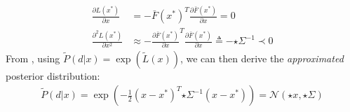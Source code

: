 %
\begin{align}
\tfrac{\partial L(x^*)}{\partial x} &= - \bar{F}(x^*)^T 
\tfrac{\partial \bar{F}(x^*)}{\partial x} = 0 
\label{eq:taylor-jacobian}
\\
\tfrac{\partial^2 L(x^*)}{\partial x^2} 
& \approx - \tfrac{\partial \bar{F}(x^*)}{\partial x}^T \tfrac{\partial \bar{F}(x^*)}{\partial x}
\triangleq %
-{\star{\Sigma}}^{-1} \prec 0
\label{eq:taylor-hessian}
\end{align}
% 
From , using $\tilde P(d|x) = \exp (\tilde{L}(x))$, we can then derive the \emph{approximated} posterior distribution:
%
\begin{align}
\tilde{P}(d|x) = \exp\left(- \tfrac{1}{2}(x - x^*)^T {\star{\Sigma}}^{-1}  (x - x^*) \right) = \mathcal{N}\left(\star{x}, \star{\Sigma} \right)
\end{align}
\fi




